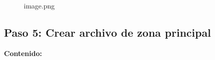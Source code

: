 \begin{figure}
\centering
{}
\caption{image.png}
\end{figure}

\subsection{Paso 5: Crear archivo de zona
principal}\label{paso-5-crear-archivo-de-zona-principal}

\begin{Shaded}
\begin{Highlighting}[]
\end{Highlighting}
\end{Shaded}

\textbf{Contenido:}


